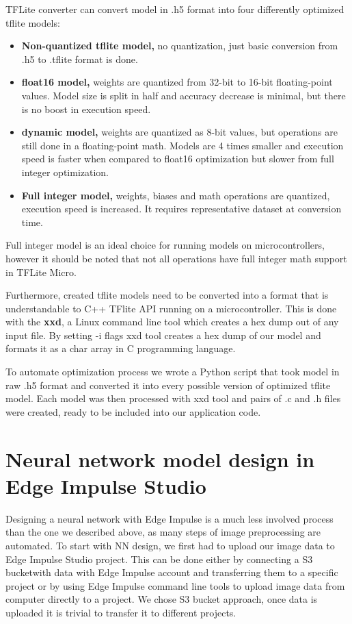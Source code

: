 TFLite converter can convert model in .h5 format into four differently optimized tflite models:
\begin{itemize}
    \item \textbf{Non-quantized tflite model,} no quantization, just basic conversion from .h5 to .tflite format is done.
    \item \textbf{float16 model,} weights are quantized from 32-bit to 16-bit floating-point values. Model size is split in half and accuracy decrease is minimal, but there is no boost in execution speed.
    \item \textbf{dynamic model,} weights are quantized as 8-bit values, but operations are still done in a floating-point math. Models are 4 times smaller and execution speed is faster when compared to float16 optimization but slower from full integer optimization.
    \item \textbf{Full integer model,} weights, biases and math operations are quantized, execution speed is increased. It requires representative dataset at conversion time.
\end{itemize}

Full integer model is an ideal choice for running models on microcontrollers, however it should be noted that not all operations have full integer math support in TFLite Micro.

Furthermore, created tflite models need to be converted into a format that is understandable to C++ TFlite API running on a microcontroller.
This is done with the \textbf{xxd}, a Linux command line tool which creates a hex dump out of any input file.
By setting -i flags xxd tool creates a hex dump of our model and formats it as a char array in C programming language. 

To automate optimization process we wrote a Python script that took model in raw .h5 format and converted it into every possible version of optimized tflite model.
Each model was then processed with xxd tool and pairs of .c and .h files were created, ready to be included into our application code.


\section{ Neural network model design in Edge Impulse Studio}

Designing a neural network with Edge Impulse is a much less involved process than the one we described above, as many steps of image preprocessing are automated.
To start with NN design, we first had to upload our image data to Edge Impulse Studio project.
This can be done either by connecting a S3 bucket\footnotemark with data with Edge Impulse account and transferring them to a specific project or by using Edge Impulse command line tools to upload image data from computer directly to a project.
We chose S3 bucket approach, once data is uploaded it is trivial to transfer it to different projects.

